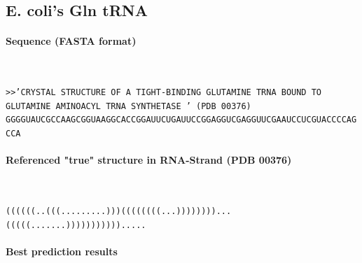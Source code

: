 \documentclass{article}
\begin{document}
\newpage
\subsection{E. coli's Gln tRNA}
\paragraph{Sequence (FASTA format)} ~ 

\texttt{>>'CRYSTAL STRUCTURE OF A TIGHT-BINDING GLUTAMINE TRNA BOUND TO GLUTAMINE AMINOACYL TRNA SYNTHETASE ' (PDB 00376)\\
GGGGUAUCGCCAAGCGGUAAGGCACCGGAUUCUGAUUCCGGAGGUCGAGGUUCGAAUCCUCGUACCCCAGCCA}

\paragraph{Referenced "true" structure in RNA-Strand (PDB 00376)} ~ 

\texttt{((((((..(((.........)))((((((((...))))))))...(((((.......))))))))))).....}

\paragraph{Best prediction results} ~ 
\end{document}
